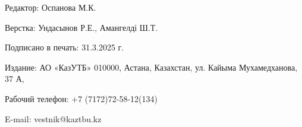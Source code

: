 \newpage

\thispagestyle{empty}
\null
\vfill
\begin{center}
Редактор: Оспанова М.К.

Верстка: Ундасынов Р.Е., Амангелді Ш.Т.

Подписано в печать: 31.3.2025 г.

Издание: АО «КазУТБ» 010000, Астана, Казахстан, ул. Кайыма Мухамедханова, 37 А,

Рабочий телефон: +7 (7172)72-58-12(134)

E-mail: vestnik@kaztbu.kz
\end{center}
\vfill
\null
